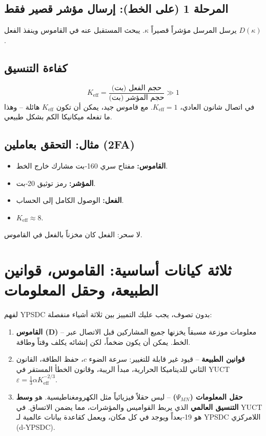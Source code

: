 \documentclass[11pt,a4paper]{article}
\begin{document}
	\subsection{المرحلة 1 (على الخط): إرسال مؤشر قصير فقط}
	يرسل المرسل مؤشراً قصيراً \(\kappa\). يبحث المستقبل عنه في القاموس وينفذ الفعل \(D(\kappa)\).
	
	\subsection{كفاءة التنسيق}
	\[
	K_{\mathrm{eff}} = \frac{\text{حجم الفعل (بت)}}{\text{حجم المؤشر (بت)}} \gg 1
	\]
	في اتصال شانون العادي، \(K_{\mathrm{eff}}=1\). مع قاموس جيد، يمكن أن تكون \(K_{\mathrm{eff}}\) هائلة -- وهذا ما تفعله ميكانيكا الكم بشكل طبيعي.
	
	\subsection{مثال: التحقق بعاملين (2FA)}
	\begin{itemize}
		\item \textbf{القاموس:} مفتاح سري 160‑بت مشارك خارج الخط.
		\item \textbf{المؤشر:} رمز توثيق 20‑بت.
		\item \textbf{الفعل:} الوصول الكامل إلى الحساب.
		\item \(K_{\mathrm{eff}} \approx 8\).
	\end{itemize}
	لا سحر: الفعل كان مخزناً بالفعل في القاموس.
	
	\section{ثلاثة كيانات أساسية: القاموس، قوانين الطبيعة، وحقل المعلومات}
	
	لفهم YPSDC بدون تصوف، يجب عليك التمييز بين ثلاثة أشياء منفصلة:
	
	\begin{enumerate}
		\item \textbf{القاموس (D)} -- معلومات موزعة مسبقاً يخزنها جميع المشاركين قبل الاتصال عبر الخط. يمكن أن يكون ضخماً، لكن إنشائه يكلف وقتاً وطاقة.
		\item \textbf{قوانين الطبيعة} -- قيود غير قابلة للتغيير: سرعة الضوء \(c\)، حفظ الطاقة، القانون الثاني للديناميكا الحرارية، مبدأ الريبة، وقانون الخطأ المستقر في YUCT \(\varepsilon = \frac13 \alpha K_{\mathrm{eff}}^{-2/3}\).
		\item \textbf{حقل المعلومات (\(\Psi_{MN}\))} -- ليس حقلاً فيزيائياً مثل الكهرومغناطيسية. هو \textbf{وسط التنسيق العالمي} الذي يربط القواميس والمؤشرات، مما يضمن الاتساق. في YUCT هو 19‑بعداً ويوجد في كل مكان، ويعمل كقاعدة بيانات عالمية لـ YPSDC اللامركزي (d‑YPSDC).
	\end{enumerate}
	
\end{document}
